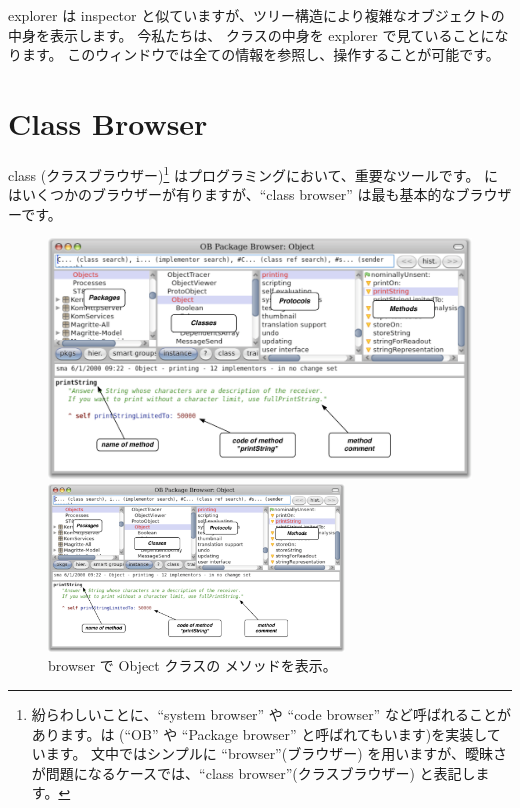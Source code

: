 \documentclass[a4paper,10pt,twoside]{book}
\begin{document}
{explorer は inspector と似ていますが、ツリー構造により複雑なオブジェクトの中身を表示します。
今私たちは、 クラスの中身を explorer で見ていることになります。
このウィンドウでは全ての情報を参照し、操作することが可能です。

\section{Class Browser}

class (クラスブラウザー)\footnote{
紛らわしいことに、``system browser'' や ``code browser'' など呼ばれることがあります。\pharo は  (``OB'' や ``Package browser'' と呼ばれてもいます)を実装しています。
文中ではシンプルに ``browser''(ブラウザー) を用いますが、曖昧さが問題になるケースでは、``class browser''(クラスブラウザー) と表記します。} はプログラミングにおいて、重要なツールです。
\pharo にはいくつかのブラウザーが有りますが、``class browser'' は最も基本的なブラウザーです。



\begin{figure}[htb]
\ifluluelse
	{\centerline {\includegraphics[width=\textwidth]{ClassBrowser1}}}
	{\centerline {\includegraphics[width=0.7\textwidth]{ClassBrowser1}}}
\caption{browser で Object クラスの  メソッドを表示。
}
\end{figure}

}
\end{document}
